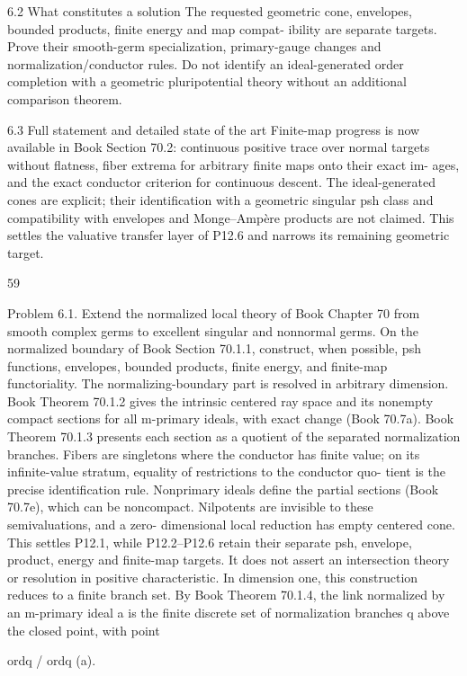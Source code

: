 \documentclass[11pt]{article}
\begin{document}
\begin{OriginalTaskDATA}
6.2   What constitutes a solution
The requested geometric cone, envelopes, bounded products, ﬁnite energy and map compat-
ibility are separate targets. Prove their smooth-germ specialization, primary-gauge changes
and normalization/conductor rules. Do not identify an ideal-generated order completion with
a geometric pluripotential theory without an additional comparison theorem.

6.3   Full statement and detailed state of the art
Finite-map progress is now available in Book Section 70.2: continuous positive trace over
normal targets without ﬂatness, ﬁber extrema for arbitrary ﬁnite maps onto their exact im-
ages, and the exact conductor criterion for continuous descent. The ideal-generated cones
are explicit; their identiﬁcation with a geometric singular psh class and compatibility with
envelopes and Monge–Ampère products are not claimed. This settles the valuative transfer
layer of P12.6 and narrows its remaining geometric target.

                                              59

Problem 6.1. Extend the normalized local theory of Book Chapter 70 from smooth complex
germs to excellent singular and nonnormal germs. On the normalized boundary of Book
Section 70.1.1, construct, when possible, psh functions, envelopes, bounded products, ﬁnite
energy, and ﬁnite-map functoriality.
    The normalizing-boundary part is resolved in arbitrary dimension. Book Theorem 70.1.2
gives the intrinsic centered ray space and its nonempty compact sections for all m-primary
ideals, with exact change (Book 70.7a). Book Theorem 70.1.3 presents each section as a
quotient of the separated normalization branches. Fibers are singletons where the conductor
has ﬁnite value; on its inﬁnite-value stratum, equality of restrictions to the conductor quo-
tient is the precise identiﬁcation rule. Nonprimary ideals deﬁne the partial sections (Book
70.7e), which can be noncompact. Nilpotents are invisible to these semivaluations, and a zero-
dimensional local reduction has empty centered cone. This settles P12.1, while P12.2–P12.6
retain their separate psh, envelope, product, energy and ﬁnite-map targets. It does not assert
an intersection theory or resolution in positive characteristic.
    In dimension one, this construction reduces to a ﬁnite branch set. By Book Theorem 70.1.4,
the link normalized by an m-primary ideal a is the ﬁnite discrete set of normalization branches
q above the closed point, with point

                                         ordq / ordq (a).


\end{OriginalTaskDATA}
\end{document}
